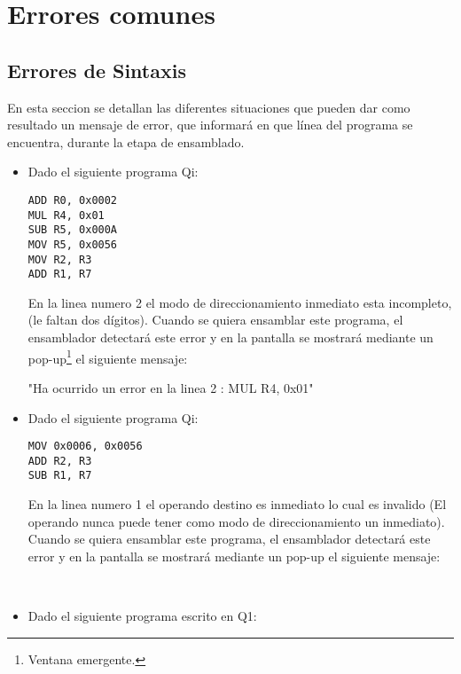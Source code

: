 \section{Errores comunes}

\subsection{Errores de Sintaxis} 

En esta seccion se detallan las diferentes situaciones que pueden dar como resultado un mensaje de error, que informará en que línea del programa se encuentra, durante la etapa de ensamblado.

\begin{itemize}

\item Dado el siguiente programa Qi:

\begin{verbatim}
ADD R0, 0x0002
MUL R4, 0x01
SUB R5, 0x000A
MOV R5, 0x0056
MOV R2, R3
ADD R1, R7
\end{verbatim}

En la linea numero 2 el modo de direccionamiento inmediato esta incompleto, (le faltan dos dígitos). Cuando se quiera ensamblar este programa, el ensamblador detectará este error y en la pantalla se mostrará mediante un pop-up\footnote{Ventana emergente.} el siguiente mensaje:
 
"Ha ocurrido un error en la linea 2 : MUL R4, 0x01" \\  

\item Dado el siguiente programa Qi:\\

\begin{verbatim}
MOV 0x0006, 0x0056
ADD R2, R3
SUB R1, R7
\end{verbatim}

En la linea numero 1 el operando destino es inmediato lo cual es invalido (El operando nunca puede tener como modo de direccionamiento un inmediato). Cuando se quiera ensamblar este programa, el ensamblador detectará este error y en la pantalla se mostrará mediante un pop-up el siguiente mensaje:

 \\

\item Dado el siguiente programa escrito en Q1:\\


\end{itemize}
